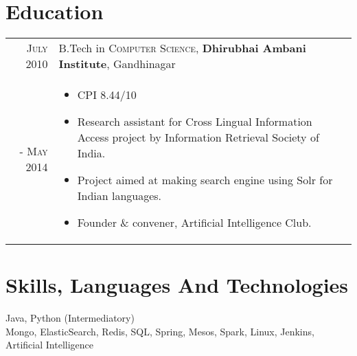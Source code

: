 \documentclass[a4paper,10pt]{article}
\begin{document}
\section{Education}
\begin{tabular}{r|p{13cm}}
 \textsc{July 2010} & B.Tech in \textsc{Computer Science}, \textbf{Dhirubhai Ambani Institute}, Gandhinagar\\  \textsc{- May 2014} &
 \begin{itemize}[noitemsep]
 \item CPI 8.44/10
 \item Research assistant for Cross Lingual Information Access project by Information Retrieval Society of India.
 \item Project aimed at making search engine using Solr for Indian languages.
 \item Founder \& convener, Artificial Intelligence Club.
 \end{itemize}



\end{tabular}

\section{Skills, Languages And Technologies}
Java, Python (Intermediatory)\\ Mongo, ElasticSearch, Redis, SQL, Spring, Mesos, Spark, Linux, Jenkins, Artificial Intelligence
\end{document}
